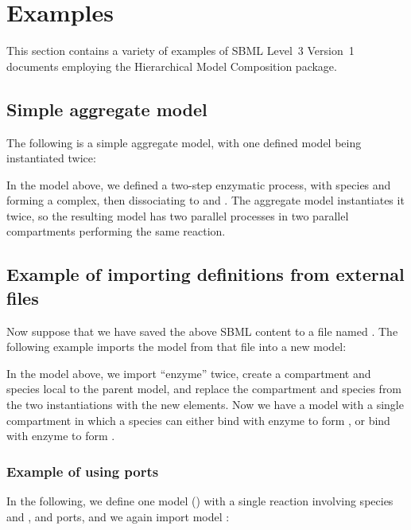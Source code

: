 
\section{Examples}
\label{examples}

This section contains a variety of examples of SBML Level~3 Version~1
documents employing the Hierarchical Model Composition package.

\subsection{Simple aggregate model}

The following is a simple aggregate model, with one defined model being
instantiated twice:


In the model above, we defined a two-step enzymatic process, with
species  and  forming a complex, then dissociating to
 and .  The aggregate model instantiates it twice, so the
resulting model  has two parallel processes in two
parallel compartments performing the same reaction.


\subsection{Example of importing definitions from external files}

Now suppose that we have saved the above SBML content to a file named
.  The following example imports the model
 from that file into a new model:


In the model above, we import ``enzyme'' twice, create a compartment and
species local to the parent model, and replace the compartment
 and species  from the two instantiations with the new
elements.  Now we have a model with a single compartment in which a
species  can either bind with enzyme  to form ,
or bind with enzyme  to form .


\subsubsection{Example of using ports}

In the following, we define one model () with a single
reaction involving species  and , and ports, and we
again import model :

